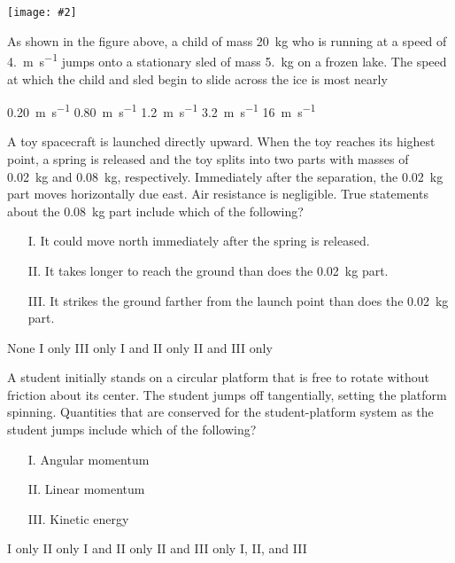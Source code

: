 \documentclass[12pt]{exam}
\newcommand{\pic}[2]{\texttt{[image: \#2]}}
\begin{document}
\begin{questions}
  \begin{center}
    \pic{.5}{child}
  \end{center}
  \question As shown in the figure above, a child of mass \SI{20}{\kilo\gram}
  who is running at a speed of \SI{4.}{\metre\per\second} jumps onto a
  stationary sled of mass \SI{5.}{\kilo\gram} on a frozen lake. The speed at
  which the child and sled begin to slide across the ice is most nearly

  \begin{choices}
    \choice \SI{.20}{\metre\per\second}
    \choice \SI{.80}{\metre\per\second}
    \choice \SI{1.2}{\metre\per\second}
    \choice \SI{3.2}{\metre\per\second}
    \choice \SI{16}{\metre\per\second}
  \end{choices}
  
  \question A toy spacecraft is launched directly upward. When the toy reaches
  its highest point, a spring is released and the toy splits into two parts
  with masses of \SI{.02}{\kilo\gram} and \SI{.08}{\kilo\gram}, respectively.
  Immediately after the separation, the \SI{.02}{\kilo\gram} part moves
  horizontally due east. Air resistance is negligible. True statements about
  the \SI{.08}{\kilo\gram} part include which of the following?
  \begin{enumerate}[nosep]
  \item[I.] It could move north immediately after the spring is released.
  \item[II.] It takes longer to reach the ground than does the
    \SI{.02}{\kilo\gram} part.
  \item[III.] It strikes the ground farther from the launch point than does the
    \SI{.02}{\kilo\gram} part.
  \end{enumerate}
  \begin{choices}
    \choice None
    \choice I only
    \choice III only
    \choice I and II only
    \choice II and III only
  \end{choices}
  
  \question A student initially stands on a circular platform that is free to
  rotate without friction about its center. The student jumps off tangentially,
  setting the platform spinning. Quantities that are conserved for the
  student-platform system as the student jumps include which of the following?
  \begin{enumerate}[nosep]
  \item[I.] Angular momentum
  \item[II.] Linear momentum
  \item[III.] Kinetic energy
  \end{enumerate}
  \begin{choices}
    \choice I only
    \choice II only
    \choice I and II only
    \choice II and III only
    \choice I, II, and III
  \end{choices}
  

\end{questions}
\end{document}

